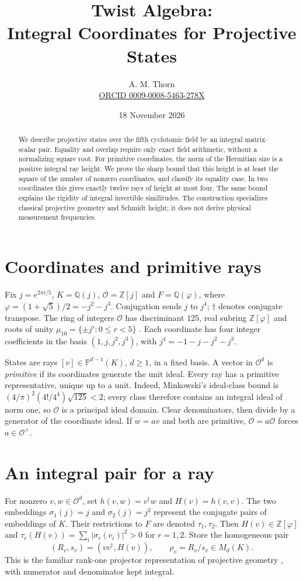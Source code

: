 \documentclass[11pt,a4paper]{article}
\title{Twist Algebra:\\Integral Coordinates for Projective States}
\author{A. M. Thorn\\\small\href{https://orcid.org/0009-0008-5463-278X}{ORCID 0009-0008-5463-278X}}
\date{18 November 2026}
\newcommand{\Z}{\mathbb Z}
\newcommand{\Q}{\mathbb Q}
\newcommand{\PP}{\mathbb P}
\newcommand{\OO}{\mathcal O}
\newcommand{\ph}{\varphi}
\begin{document}
\maketitle
\begin{abstract}
We describe projective states over the fifth cyclotomic field by an
integral matrix--scalar pair. Equality and overlap require only exact
field arithmetic, without a normalizing square root. For primitive
coordinates, the norm of the Hermitian size is a positive integral ray
height. We prove the sharp bound that this height is at least the square
of the number of nonzero coordinates, and classify its equality case.
In two coordinates this gives exactly twelve rays of height at most
four. The same bound explains the rigidity of integral invertible
similitudes. The construction specializes classical projective geometry
and Schmidt height; it does not derive physical measurement frequencies.
\end{abstract}

\section{Coordinates and primitive rays}\label{sec:coordinates}
Fix $j=e^{2\pi i/5}$, $K=\Q(j)$, $\OO=\Z[j]$ and
$F=\Q(\ph)$, where $\ph=(1+\sqrt5)/2=-j^2-j^3$.
Conjugation sends $j$ to $j^4$; $\dagger$ denotes conjugate transpose.
The ring of integers $\OO$ has discriminant $125$, real subring
$\Z[\ph]$ and roots of unity
$\mu_{10}=\{\pm j^r:0\leq r<5\}$ \cite{washington}.
Each coordinate has four integer coefficients in the basis
$(1,j,j^2,j^3)$, with $j^4=-1-j-j^2-j^3$.

States are rays $[v]\in\PP^{d-1}(K)$, $d\geq1$, in a fixed basis.
A vector in $\OO^d$ is \emph{primitive} if its coordinates generate
the unit ideal. Every ray has a primitive representative, unique up
to a unit. Indeed, Minkowski's ideal-class bound is
$(4/\pi)^2(4!/4^4)\sqrt{125}<2$; every class therefore contains
an integral ideal of norm one, so $\OO$ is a principal ideal domain.
Clear denominators, then divide by a generator of the coordinate ideal.
If $w=av$ and both are primitive, $\OO=a\OO$ forces
$a\in\OO^\times$.

\section{An integral pair for a ray}\label{sec:pairs}
For nonzero $v,w\in\OO^d$, set $h(v,w)=v^\dagger w$ and
$H(v)=h(v,v)$. The two embeddings $\sigma_1(j)=j$ and
$\sigma_2(j)=j^2$ represent the conjugate pairs of embeddings of $K$.
Their restrictions to $F$ are denoted $\tau_1,\tau_2$.
Then $H(v)\in\Z[\ph]$ and
$\tau_r(H(v))=\sum_i|\sigma_r(v_i)|^2>0$ for $r=1,2$.
Store the homogeneous pair
\begin{equation}\label{eq:pair}
 (R_v,s_v)=(vv^\dagger,H(v)),\qquad
 \rho_v=R_v/s_v\in M_d(K).
\end{equation}
This is the familiar rank-one projector representation of projective
geometry \cite{brody}, with numerator and denominator kept integral.
\end{document}

